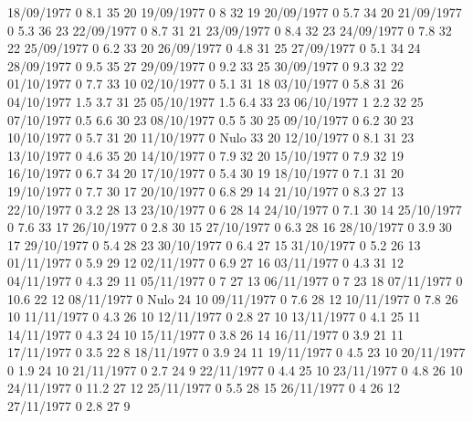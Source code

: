 18/09/1977  0      8.1    35     20 
19/09/1977  0      8      32     19 
20/09/1977  0      5.7    34     20 
21/09/1977  0      5.3    36     23 
22/09/1977  0      8.7    31     21 
23/09/1977  0      8.4    32     23 
24/09/1977  0      7.8    32     22 
25/09/1977  0      6.2    33     20 
26/09/1977  0      4.8    31     25 
27/09/1977  0      5.1    34     24 
28/09/1977  0      9.5    35     27 
29/09/1977  0      9.2    33     25 
30/09/1977  0      9.3    32     22 
01/10/1977  0      7.7    33     10 
02/10/1977  0      5.1    31     18 
03/10/1977  0      5.8    31     26 
04/10/1977  1.5    3.7    31     25 
05/10/1977  1.5    6.4    33     23 
06/10/1977  1      2.2    32     25 
07/10/1977  0.5    6.6    30     23 
08/10/1977  0.5    5      30     25 
09/10/1977  0      6.2    30     23 
10/10/1977  0      5.7    31     20 
11/10/1977  0     Nulo    33     20 
12/10/1977  0      8.1    31     23 
13/10/1977  0      4.6    35     20 
14/10/1977  0      7.9    32     20 
15/10/1977  0      7.9    32     19 
16/10/1977  0      6.7    34     20 
17/10/1977  0      5.4    30     19 
18/10/1977  0      7.1    31     20 
19/10/1977  0      7.7    30     17 
20/10/1977  0      6.8    29     14 
21/10/1977  0      8.3    27     13 
22/10/1977  0      3.2    28     13 
23/10/1977  0      6      28     14 
24/10/1977  0      7.1    30     14 
25/10/1977  0      7.6    33     17 
26/10/1977  0      2.8    30     15 
27/10/1977  0      6.3    28     16 
28/10/1977  0      3.9    30     17 
29/10/1977  0      5.4    28     23 
30/10/1977  0      6.4    27     15 
31/10/1977  0      5.2    26     13 
01/11/1977  0      5.9    29     12 
02/11/1977  0      6.9    27     16 
03/11/1977  0      4.3    31     12 
04/11/1977  0      4.3    29     11 
05/11/1977  0      7      27     13 
06/11/1977  0      7      23     18 
07/11/1977  0      10.6   22     12 
08/11/1977  0     Nulo    24     10 
09/11/1977  0      7.6    28     12 
10/11/1977  0      7.8    26     10 
11/11/1977  0      4.3    26     10 
12/11/1977  0      2.8    27     10 
13/11/1977  0      4.1    25     11 
14/11/1977  0      4.3    24     10 
15/11/1977  0      3.8    26     14 
16/11/1977  0      3.9    21     11 
17/11/1977  0      3.5    22     8 
18/11/1977  0      3.9    24     11 
19/11/1977  0      4.5    23     10 
20/11/1977  0      1.9    24     10 
21/11/1977  0      2.7    24     9 
22/11/1977  0      4.4    25     10 
23/11/1977  0      4.8    26     10 
24/11/1977  0      11.2   27     12 
25/11/1977  0      5.5    28     15 
26/11/1977  0      4      26     12 
27/11/1977  0      2.8    27     9 
